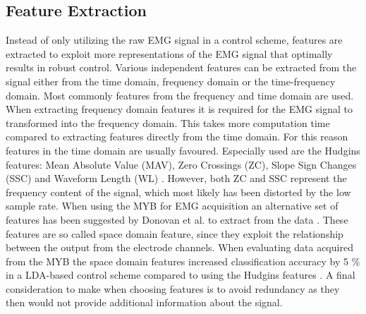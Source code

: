 \subsection{Feature Extraction}
Instead of only utilizing the raw EMG signal in a control scheme, features are extracted to exploit more representations of the EMG signal that optimally results in robust control. Various independent features can be extracted from the signal either from the time domain, frequency domain or the time-frequency domain. Most commonly features from the frequency and time domain are used. When extracting frequency domain features it is required for the EMG signal to transformed into the frequency domain. This takes more computation time compared to extracting features directly from the time domain. For this reason features in the time domain are usually favoured. \cite{Phiny2012} Especially used are the Hudgins features: Mean Absolute Value (MAV), Zero Crossings (ZC), Slope Sign Changes (SSC) and Waveform Length (WL) \cite{Hudgins1993}. However, both ZC and SSC represent the frequency content of the signal, which most likely has been distorted by the low sample rate. When using the MYB for EMG acquisition an alternative set of features has been suggested by Donovan et al. to extract from the data \cite{Donovan2017}. These features are so called space domain feature, since they exploit the relationship between the output from the electrode channels. When evaluating data acquired from the MYB the space domain features increased classification accuracy by 5 \% in a LDA-based control scheme compared to using the Hudgins features \cite{Donovan2017}. A final consideration to make when choosing features is to avoid redundancy as they then would not provide additional information about the signal. 

